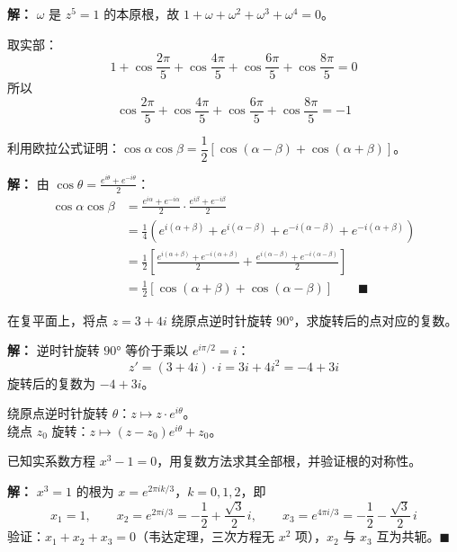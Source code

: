 \documentclass[12pt, a4paper]{ctexart}
\begin{document}
\textbf{解：}
$\omega$ 是 $z^5=1$ 的本原根，故 $1+\omega+\omega^2+\omega^3+\omega^4=0$。

取实部：
\[
  1+\cos\frac{2\pi}{5}+\cos\frac{4\pi}{5}+\cos\frac{6\pi}{5}+\cos\frac{8\pi}{5} = 0
\]
所以
\[
  \cos\frac{2\pi}{5}+\cos\frac{4\pi}{5}+\cos\frac{6\pi}{5}+\cos\frac{8\pi}{5} = \boxed{-1}
\]

\begin{examplebox}[【例题6】用复数推导积化和差]
利用欧拉公式证明：$\cos\alpha\cos\beta = \dfrac{1}{2}[\cos(\alpha-\beta)+\cos(\alpha+\beta)]$。
\end{examplebox}

\textbf{解：}
由 $\cos\theta = \frac{e^{i\theta}+e^{-i\theta}}{2}$：
\begin{align*}
  \cos\alpha\cos\beta &= \frac{e^{i\alpha}+e^{-i\alpha}}{2}\cdot\frac{e^{i\beta}+e^{-i\beta}}{2} \\
  &= \frac{1}{4}\left(e^{i(\alpha+\beta)}+e^{i(\alpha-\beta)}+e^{-i(\alpha-\beta)}+e^{-i(\alpha+\beta)}\right) \\
  &= \frac{1}{2}\left[\frac{e^{i(\alpha+\beta)}+e^{-i(\alpha+\beta)}}{2}+\frac{e^{i(\alpha-\beta)}+e^{-i(\alpha-\beta)}}{2}\right] \\
  &= \frac{1}{2}[\cos(\alpha+\beta)+\cos(\alpha-\beta)] \qquad\blacksquare
\end{align*}

\begin{examplebox}[【例题7】复数旋转应用]
在复平面上，将点 $z=3+4i$ 绕原点逆时针旋转 $90°$，求旋转后的点对应的复数。
\end{examplebox}

\textbf{解：}
逆时针旋转 $90°$ 等价于乘以 $e^{i\pi/2}=i$：
\[
  z' = (3+4i)\cdot i = 3i+4i^2 = -4+3i
\]
旋转后的复数为 $\boxed{-4+3i}$。

\begin{tipbox}[旋转公式]
绕原点逆时针旋转 $\theta$：$z\mapsto z\cdot e^{i\theta}$。\\
绕点 $z_0$ 旋转：$z\mapsto (z-z_0)e^{i\theta}+z_0$。
\end{tipbox}

\begin{examplebox}[【例题8】复数与实系数方程]
已知实系数方程 $x^3-1=0$，用复数方法求其全部根，并验证根的对称性。
\end{examplebox}

\textbf{解：}
$x^3=1$ 的根为 $x=e^{2\pi ik/3}$，$k=0,1,2$，即
\[
  x_1 = 1,\qquad x_2 = e^{2\pi i/3} = -\frac{1}{2}+\frac{\sqrt{3}}{2}\,i, \qquad x_3 = e^{4\pi i/3} = -\frac{1}{2}-\frac{\sqrt{3}}{2}\,i
\]
验证：$x_1+x_2+x_3=0$（韦达定理，三次方程无 $x^2$ 项），$x_2$ 与 $x_3$ 互为共轭。$\blacksquare$
\end{document}
